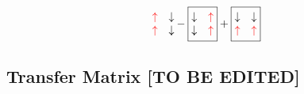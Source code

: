 \documentclass[prl,aps,twocolumn,showpacs,superscriptaddress,longbibliography]{revtex4-1}
\begin{document}
\begin{eqnarray}
{\begin{matrix}
  {\color{red} \uparrow} & \downarrow \\
  {\color{red} \uparrow} & \downarrow
 \end{matrix}
}
-
\boxed{
\begin{matrix}
  \downarrow & {\color{red} \uparrow} \\
  \downarrow & {\color{red} \uparrow}
 \end{matrix}
}
+
\boxed{
\begin{matrix}
  \downarrow & \downarrow \\
  {\color{red} \uparrow} & {\color{red} \uparrow}
 \end{matrix}
} \nonumber \\

\end{eqnarray}



\subsection{Transfer Matrix [TO BE EDITED]}
\end{document}
